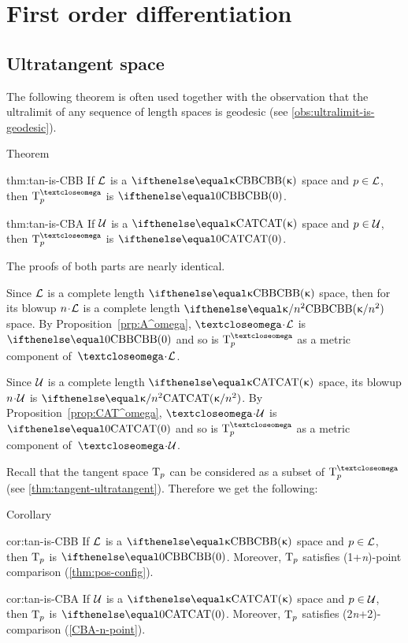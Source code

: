 \chapter{First order differentiation}\label{chap:tan}

\section{Ultratangent space} 

The following theorem is often used together with the 
observation that the ultralimit of any sequence of length spaces is geodesic (see \ref{obs:ultralimit-is-geodesic}).

\begin{thm}{Theorem}\label{thm:tan-is}
\begin{subthm}{thm:tan-is-CBB}
If $\mathcal{L}$ is a $\Alex{\kappa}$ space and $p\in \spc{L}$, then $\T^\o_p$ is $\Alex{0}$.
\end{subthm}

\begin{subthm}{thm:tan-is-CBA}
If $\mathcal{U}$ is a $\CAT\kappa$ space and $p\in \spc{U}$, then $\T^\o_p$ is $\CAT0$.
\end{subthm}

\end{thm}

The proofs of both parts are nearly identical.

Since $\mathcal{L}$ is a complete length $\Alex{\kappa}$ space, then for its blowup $n\cdot\spc{L}$ is a complete length $\Alex{\kappa/{n^{2}}}$ space.
By Proposition~\ref{prp:A^omega}, $\o\cdot\spc{L}$ is $\Alex0$
and so is $\T_p^\o$ as a metric component of~$\o\cdot\spc{L}$.

Since $\mathcal{U}$ is a complete length $\CAT\kappa$ space, its blowup $n\cdot\spc{U}$ is $\CAT{\kappa/{n^{2}}}$.
By Proposition~\ref{prop:CAT^omega}, $\o\cdot\spc{U}$ is $\CAT0$
and so is $\T_p^\o$ as a metric component of~$\o\cdot\spc{U}$.
\qeds

Recall that the tangent space $\text{\rm T}_p$ can be considered as a subset of $\T^\o_p$ (see \ref{thm:tangent-ultratangent}).
Therefore we get the following:

\begin{thm}{Corollary}\label{cor:real-tan-is}
\begin{subthm}{cor:tan-is-CBB}
If $\mathcal{L}$ is a $\Alex{\kappa}$ space and $p\in \spc{L}$, then $\text{\rm T}_p$ is $\Alex{0}$.
Moreover, $\text{\rm T}_p$ satisfies (1+\textit{n})-point comparison (\ref{thm:pos-config}).
\end{subthm}

\begin{subthm}{cor:tan-is-CBA}
If $\mathcal{U}$ is a $\CAT\kappa$ space and $p\in \spc{U}$, then $\text{\rm T}_p$ is $\CAT0$.
Moreover, $\text{\rm T}_p$ satisfies (2\textit{n}+2)-comparison (\ref{CBA-n-point}).
\end{subthm}

\end{thm}



